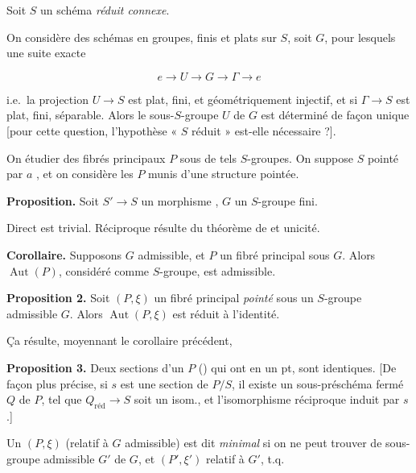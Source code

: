 \documentclass[11pt,a4paper]{article}
\begin{document}

Soit $S$ un schéma \emph{réduit connexe}.

On considère des schémas en groupes, finis et plats sur $S$, soit $G$, pour
lesquels \ill{} une suite exacte

\[ e \to U \to G \to \Gamma \to e \]

i.e.\ la projection $U \to S$ est plat, fini,  et géométriquement
 injectif, et si $\Gamma \to S$ est plat, fini,
séparable. Alors le sous-$S$-groupe $U$ de $G$ est déterminé de façon unique
[pour cette question, l'hypothèse « $S$ réduit » est-elle nécessaire ?].

On   étudier des fibrés principaux $P$ sous de tels
$S$-groupes. On suppose $S$ pointé par $a$ \struck{\ill{}}, et on considère
les $P$ munis d'une structure pointée.

\textbf{Proposition.} \struck{\ill{}} Soit $S' \to S$ un morphisme
\struck{\ill{}}, $G$ un $S$-groupe fini.  \struck{\ill{}} 

Direct est trivial. Réciproque résulte du \ill{} théorème de
\ill{} et unicité.


\textbf{Corollaire.} Supposons $G$ admissible, et $P$ un fibré principal sous
$G$. Alors $\operatorname{Aut}(P)$, considéré comme $S$-groupe, est admissible.

\textbf{Proposition 2.} Soit $(P, \xi)$ un fibré principal \emph{pointé} sous
un $S$-groupe admissible $G$. Alors $\operatorname{Aut}(P, \xi)$ est réduit à
l'identité.

Ça résulte, moyennant le corollaire précédent, 

 \textbf{Proposition 3.} Deux sections d'un \struck{\ill{}}
 $P$ ()  qui
ont  en un pt, sont identiques. [De façon plus précise, si $s$ est une
section de $P/S$, il existe un sous-préschéma fermé $Q$ de $P$, tel que
$Q_{\mathrm{réd}} \to S$ soit un isom., et l'isomorphisme réciproque induit par
$s$.]

Un $(P, \xi)$  (relatif à $G$ admissible) est dit
\emph{minimal} si on ne peut trouver de sous-groupe admissible $G'$ de $G$, et
$(P', \xi')$ relatif à $G'$, t.q.
\end{document}
